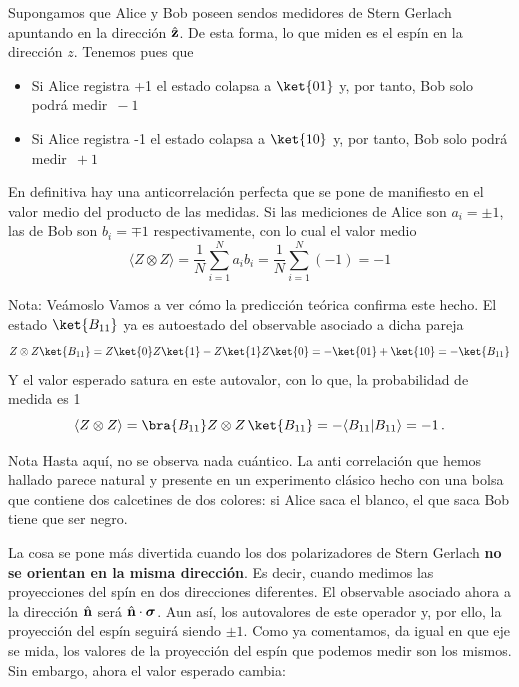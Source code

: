 \documentclass[a4paper,11pt]{book} %
\numberwithin{equation}{chapter}
\newcommand{\braket}[2]{\langle #1|#2\rangle}
\begin{document}
Supongamos que  Alice y Bob poseen sendos medidores de Stern Gerlach apuntando en la dirección $\hat{\bf z}$. De esta forma, lo que miden es el espín en la dirección $z$. Tenemos pues que
	\begin{itemize}
		\item Si Alice registra +1 el estado colapsa a $\ket{01}$ y, por tanto, Bob solo podrá medir  $\, -1$
		\item Si Alice registra -1 el estado colapsa a $\ket{10}$ y, por tanto, Bob solo podrá medir  $\, +1$
	\end{itemize}
En definitiva hay una anticorrelación perfecta que se pone de manifiesto en el valor medio del producto de las medidas. Si las mediciones de Alice son $a_i=\pm 1$, las de Bob son $b_i=\mp 1$ respectivamente, con lo cual el valor medio
$$
\langle Z\otimes Z\rangle = \frac{1}{N}\sum_{i=1}^N a_i b_i =\frac{1}{N}\sum_{i=1}^N (-1) = -1
$$

	\begin{mybox_blue}{Nota: Veámoslo}
	Vamos a ver cómo la predicción teórica confirma este hecho. El estado $\ket{B_{11}}$ ya es autoestado 
	del observable asociado a dicha pareja
	$$
	Z\otimes Z \ket{B_{11}} = Z\ket{0}Z\ket{1} - Z\ket{1}Z\ket{0} = -\ket{01} + \ket{10} = -\ket{B_{11}}
	$$
	Y el valor esperado satura en este autovalor, con lo que, la probabilidad de medida es 1
	$$
	\langle Z\otimes Z\rangle = \bra{B_{11}}Z\otimes Z\,  \ket{B_{11}}  = -\braket{B_{11}}{B_{11}}= -1\, .
	$$
	\end{mybox_blue}

	
	\begin{mybox_blue}{Nota }
	Hasta aquí, no se observa nada cuántico. La anti correlación que hemos hallado parece natural y presente en un 
	experimento clásico hecho con una bolsa que contiene dos calcetines de dos colores: si Alice saca el blanco, 
	el que saca Bob tiene que ser negro.
	\end{mybox_blue}

La cosa se pone más divertida cuando los dos polarizadores de Stern Gerlach \textbf{no se orientan en la misma dirección}. Es decir, cuando medimos las proyecciones del spín en dos direcciones diferentes. El observable asociado ahora a la dirección $\hat{\bf n}$  será  $\hat{\bf n}\cdot \boldsymbol{\sigma}$. Aun así, los autovalores de este operador y, por ello, la proyección del espín seguirá siendo $\pm 1$. Como ya comentamos, da igual en que eje se mida, los valores de la proyección del espín que podemos medir son los mismos. Sin embargo, ahora el valor esperado cambia:
\end{document}
